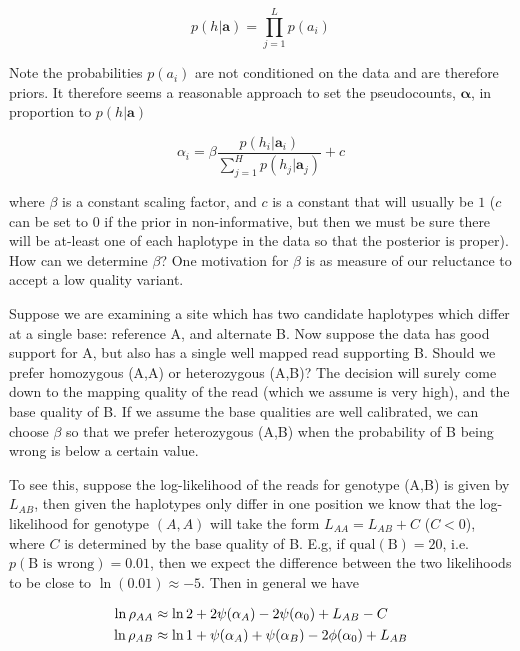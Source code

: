 \documentclass{article}
\begin{document}
\begin{equation}
    p(h | \boldsymbol{a}) = \prod_{j = 1}^L p(a_i)
\end{equation}

Note the probabilities $p(a_i)$ are not conditioned on the data and are therefore priors. It therefore seems a reasonable approach to set the pseudocounts, $\boldsymbol{\alpha}$, in proportion to $p(h | \boldsymbol{a})$

\begin{equation}
    \alpha_i = \beta \frac{p(h_i | \boldsymbol{a}_i)}{\sum_{j = 1}^H p(h_j | \boldsymbol{a}_j)} + c
\end{equation}

where $\beta$ is a constant scaling factor, and $c$ is a constant that will usually be $1$ ($c$ can be set to $0$ if the prior in non-informative, but then we must be sure there will be at-least one of each haplotype in the data so that the posterior is proper). How can we determine $\beta$? One motivation for $\beta$ is as measure of our reluctance to accept a low quality variant.

Suppose we are examining a site which has two candidate haplotypes which differ at a single base: reference A, and alternate B. Now suppose the data has good support for A, but also has a single well mapped read supporting B. Should we prefer homozygous (A,A) or heterozygous (A,B)? The decision will surely come down to the mapping quality of the read (which we assume is very high), and the base quality of B. If we assume the base qualities are well calibrated, we can choose $\beta$ so that we prefer heterozygous (A,B) when the probability of B being wrong is below a certain value.

To see this, suppose the log-likelihood of the reads for genotype (A,B) is given by $L_{AB}$, then given the haplotypes only differ in one position we know that the log-likelihood for genotype $(A,A)$ will take the form $L_{AA} = L_{AB} + C$ ($C < 0$), where $C$ is determined by the base quality of B. E.g, if $\text{qual}(\text{B}) = 20$, i.e. $p(\text{B is wrong}) = 0.01$, then we expect the difference between the two likelihoods to be close to $\ln(0.01) \approx -5$. Then in general we have

\begin{align}
\ln \rho_{AA} &\approx \ln 2 + 2 \psi(\alpha_A) - 2 \psi(\alpha_0) + L_{AB} - C \notag \\
\ln \rho_{AB} &\approx \ln 1 + \psi(\alpha_A) + \psi(\alpha_B) - 2 \phi(\alpha_0) + L_{AB} \notag
\end{align}
\end{document}
